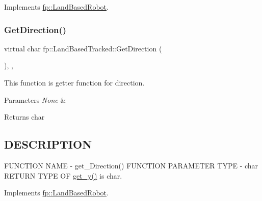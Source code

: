 Implements \hyperlink{classfp_1_1_land_based_robot_ae742797bee07ac5b92bfe934cbfed6e9}{fp\+::\+Land\+Based\+Robot}.

\mbox{\label{classfp_1_1_land_based_tracked_acb4201d9ba3660fbdb52bc95cddaa5bf}} 
\subsubsection{\texorpdfstring{Get\+Direction()}{GetDirection()}}
{\footnotesize\ttfamily virtual char fp\+::\+Land\+Based\+Tracked\+::\+Get\+Direction (\begin{DoxyParamCaption}{ }\end{DoxyParamCaption})\hspace{0.3cm}{\ttfamily [inline]}, {\ttfamily [override]}, {\ttfamily [virtual]}}



This function is getter function for direction. 


\begin{DoxyParams}{Parameters}
{\em None} & \\
\hline
\end{DoxyParams}
\begin{DoxyReturn}{Returns}
char 
\end{DoxyReturn}
\hypertarget{_m_a_z_e_8h_DESCRIPTION}{}\subsection{D\+E\+S\+C\+R\+I\+P\+T\+I\+ON}\label{_m_a_z_e_8h_DESCRIPTION}
F\+U\+N\+C\+T\+I\+ON N\+A\+ME -\/ get\+\_\+\+Direction() F\+U\+N\+C\+T\+I\+ON P\+A\+R\+A\+M\+E\+T\+ER T\+Y\+PE -\/ char R\+E\+T\+U\+RN T\+Y\+PE OF \hyperlink{classfp_1_1_land_based_tracked_a09738928390e7e0d33444b6a7cfcc841}{get\+\_\+y()} is char. 

Implements \hyperlink{classfp_1_1_land_based_robot_a50841b6e40d4e92832770d26b427fea2}{fp\+::\+Land\+Based\+Robot}.

\mbox{\label{classfp_1_1_land_based_tracked_af537a096f507674b62a9691fad7c6cb7}} 
